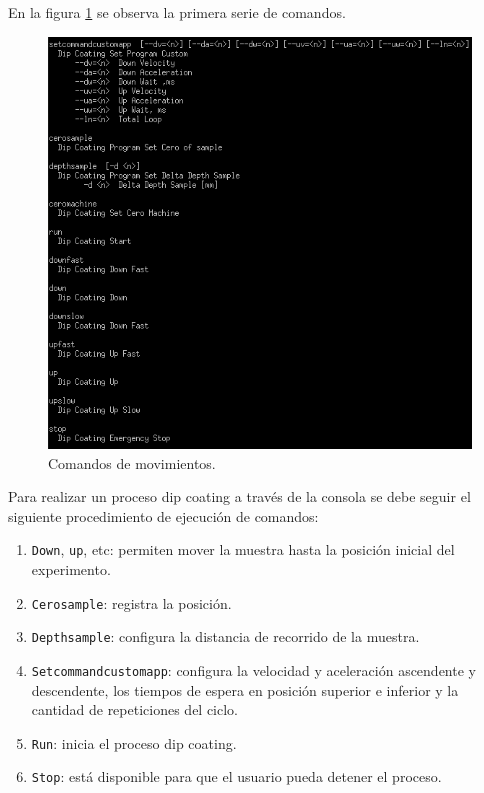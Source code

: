 En la figura \ref{fig:consola_movimientos} se observa la primera serie de comandos. 
\begin{figure}[h!]
	\centering
	\includegraphics[width=1\textwidth]{./Figures/consola_2.png}
	\caption{Comandos de movimientos.}
	\label{fig:consola_movimientos}
\end{figure}



Para realizar un proceso dip coating a través de la consola se debe seguir el siguiente procedimiento de ejecución de comandos:
\begin{enumerate}
\item \verb|Down|, \verb|up|, etc: permiten mover la muestra hasta la posición inicial del experimento.
\item \verb|Cerosample|: registra la posición.
\item \verb|Depthsample|: configura la distancia de recorrido de la muestra.
\item \verb|Setcommandcustomapp|: configura la velocidad y aceleración ascendente y descendente, los tiempos de espera en posición superior e inferior y la cantidad de repeticiones del ciclo.
\item \verb|Run|: inicia el proceso dip coating.
\item \verb|Stop|: está disponible para que el usuario pueda detener el proceso.

\end{enumerate}


